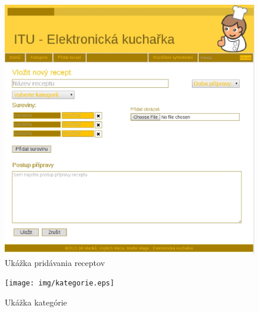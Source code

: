 \documentclass[12pt,a4paper,titlepage,final]{article}
\begin{document}
\begin{figure}

\begin{center}

\includegraphics[scale=0.7]{img/pridatrecept.eps} 
\caption{Ukážka pridávania receptov}


\end{center}

\end{figure}

\begin{figure}

\begin{center}

\texttt{[image: img/kategorie.eps]} 
\caption{Ukážka kategórie}


\end{center}

\end{figure}
\end{document}
